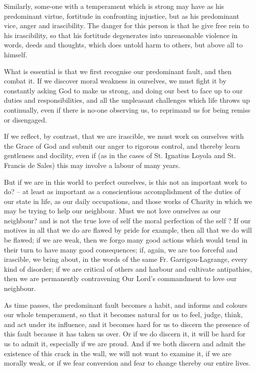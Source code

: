 Similarly, some-one with a temperament which is strong may have as his predominant virtue, fortitude in confronting injustice, but as his predominant vice, anger and irascibility. The danger for this person is that he give free rein to his irascibility, so that his fortitude degenerates into unreasonable violence in words, deeds and thoughts, which does untold harm to others, but above all to himself.

What is essential is that we first recognise our predominant fault, and then combat it. If we discover moral weakness in ourselves, we must fight it by constantly asking God to make us strong, and doing our best to face up to our duties and responsibilities, and all the unpleasant challenges which life throws up continually, even if there is no-one observing us, to reprimand us for being remiss or disengaged.

If we reflect, by contrast, that we are irascible, we must work on ourselves with the Grace of God and submit our anger to rigorous control, and thereby learn gentleness and docility, even if (as in the cases of St. Ignatius Loyola and St. Francis de Sales) this may involve a labour of many years.

But if we are in this world to perfect ourselves, is this not an important work to do? – at least as important as a conscientious accomplishment of the duties of our state in life, as our daily occupations, and those works of Charity in which we may be trying to help our neighbour. Must we not love ourselves as our neighbour? and is not the true love of self the moral perfection of the self ? If our motives in all that we do are flawed by pride for example, then all that we do will be flawed; if we are weak, then we forgo many good actions which would tend in their turn to have many good consequences; if, again, we are too forceful and irascible, we bring about, in the words of the same Fr. Garrigou-Lagrange, every kind of disorder; if we are critical of others and harbour and cultivate antipathies, then we are permanently contravening Our Lord's commandment to love our neighbour.

As time passes, the predominant fault becomes a habit, and informs and colours our whole temperament, so that it becomes natural for us to feel, judge, think, and act under its influence, and it becomes hard for us to discern the presence of this fault because it has taken us over. Or if we do discern it, it will be hard for us to admit it, especially if we are proud. And if we both discern and admit the existence of this crack in the wall, we will not want to examine it, if we are morally weak, or if we fear conversion and fear to change thereby our entire lives.

